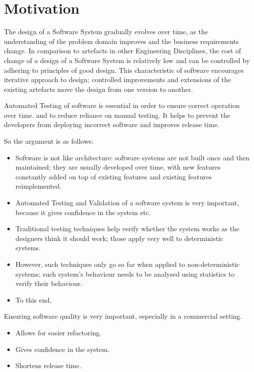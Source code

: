 \section{Motivation}

The design of a Software System gradually evolves over time, as the understanding of the problem domain improves and the business requirements change. In comparison to artefacts in other Engineering Disciplines, the cost of change of a design of a Software System is relatively low and can be controlled by adhering to principles of good design. This characteristic of software encourages iterative approach to design; controlled improvements and extensions of the existing artefacts move the design from one version to another.

Automated Testing of software is essential in order to ensure correct operation over time. and to reduce reliance on manual testing. It helps to prevent the developers from deploying incorrect software and improves release time.

So the argument is as follows:
\begin{itemize}
\item Software is not like architecture: software systems are not built once and then maintained; they are usually developed over time, with new features constantly added on top of existing features and existing features reimplemented.
\item Automated Testing and Validation of a software system is very important, because it gives confidence in the system etc.
\item Traditional testing techniques help verify whether the system works as the designers think it should work; those apply very well to deterministic systems.
\item However, such techniques only go so far when applied to non-deterministic systems; such system's behaviour needs to be analysed using statistics to verify their behaviour.
\item To this end, 
\end{itemize}


Ensuring software quality is very important, especially in a commercial setting. 

\begin{itemize}
\item Allows for easier refactoring.
\item Gives confidence in the system.
\item Shortens release time. 
\end{itemize}
 
